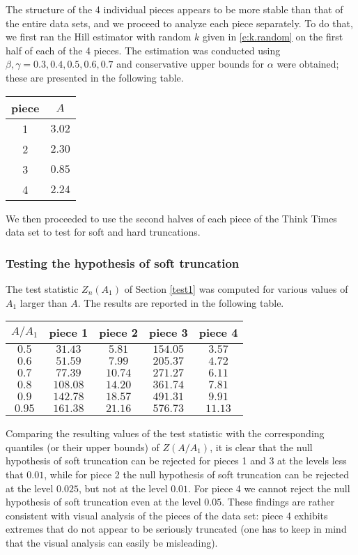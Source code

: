 \documentclass[11pt]{amsart}
\numberwithin{equation}{section}
\begin{document}
The structure of the 4 individual pieces appears to be more stable
than that of the entire data sets, and we proceed to analyze each
piece separately. To do that, we first ran the Hill estimator with
random $k$ given in \eqref{e:k.random} on the first half of each
of the 4 pieces. The estimation was conducted using $\beta,
\gamma=0.3,0.4, 0.5, 0.6, 0.7$ and conservative upper bounds for
$\alpha$ were obtained; these are presented in the following
table.

\begin{center}
\begin{tabular}{c|c}
piece & $A$\\
\hline
1 & $3.02$\\
2 & $2.30$\\
3 & $0.85$\\
4 & $2.24$
\end{tabular}
\end{center}
We then proceeded to use the second halves of each piece of the Think
Times data set to test for soft and hard truncations.

\subsubsection*{Testing the hypothesis of soft truncation}
The test statistic $Z_n(A_1)$ of Section
\ref{test1}  was computed for
various values of $A_1$ larger than $A$. The results are reported in
the following table.
\begin{center}
\begin{tabular}{c|cccc}
$A/A_1$&piece 1&piece 2&piece 3&piece 4\\
\hline
$0.5$&$31.43$&$5.81$&$154.05$&$3.57$\\
$0.6$&$51.59$&$7.99$&$205.37$&$4.72$\\
$0.7$&$77.39$&$10.74$&$271.27$&$6.11$\\
$0.8$&$108.08$&$14.20$&$361.74$&$7.81$\\
$0.9$&$142.78$&$18.57$&$491.31$&$9.91$\\
$0.95$&$161.38$&$21.16$&$576.73$&$11.13$
\end{tabular}
\end{center}
Comparing the resulting values of the test statistic  with the
corresponding quantiles (or their upper bounds) of $Z(A/A_1)$, it is
clear that the null hypothesis
of soft truncation can be rejected for pieces 1 and 3 at the
levels less that $0.01$, while for piece
2 the null hypothesis of soft truncation can be rejected at the level
$0.025$, but not at the level $0.01$. For piece 4 we cannot reject the
null hypothesis of soft truncation even at the level $0.05$. These
findings are rather consistent with visual analysis of the pieces of
the data set: piece 4 exhibits extremes that do not appear to be
seriously truncated (one has to keep in mind that the visual analysis
can easily be misleading). 
\end{document}
